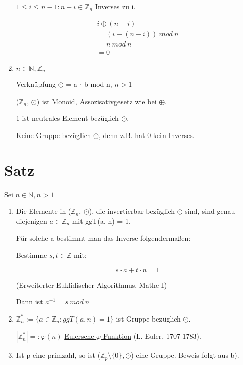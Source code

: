 \documentclass[a4paper, openany]{book}
\begin{document}
\begin{enumerate}[label=(\alph*)]
    $1 \leq i \le n-1: n-i \in \mathbb{Z}_n$ Inverses zu i.

    \begin{equation}
      \begin{split}
        i \oplus (n-i) \\
        = (i+(n-i)) \ mod \ n \\
        = n \ mod\  n \\
        = 0
      \end{split}
    \end{equation}

    \item $n \in \mathbb{N}, \mathbb{Z}_n$

    Verknüpfung $\odot$ = a $\cdot$ b mod n, $n > 1$

    ($\mathbb{Z}_n$, $\odot$) ist Monoid, Assozisativgesetz wie bei $\oplus$.

    1 ist neutrales Element bezüglich $\odot$. 

    Keine Gruppe bezüglich $\odot$, denn z.B. hat 0 kein Inverses.

  \end{enumerate}

  \section{Satz}

  Sei $n \in \mathbb{N}, n > 1$

  \begin{enumerate}[label=(\alph*)]
    \item Die Elemente in ($\mathbb{Z}_n$, $\odot$), die invertierbar bezüglich $\odot$ sind, sind genau diejenigen $a \in \mathbb{Z}_n$ mit ggT(a, n) = 1.

    Für solche a bestimmt man das Inverse folgendermaßen:

    Bestimme $s, t \in \mathbb{Z}$ mit:

    \begin{equation}
      s \cdot a + t \cdot n = 1
    \end{equation}

    (Erweiterter Euklidischer Algorithmus, Mathe I)

    Dann ist $a^{-1} = s \ mod \ n$

    \item $\mathbb{Z}_{n}^{\ast} := \{a \in \mathbb{Z}_n : ggT(a,n) = 1\}$ ist Gruppe bezüglich $\odot$.

    $|\mathbb{Z}_{n}^{\ast}| =: \varphi(n)$ \underline{Eulersche $\varphi$-Funktion} (L. Euler, 1707-1783).

    \item Ist p eine primzahl, so ist ($\mathbb{Z}_p \setminus \{0\}, \odot$) eine Gruppe. Beweis folgt aus b).
  \end{enumerate}
\end{document}
